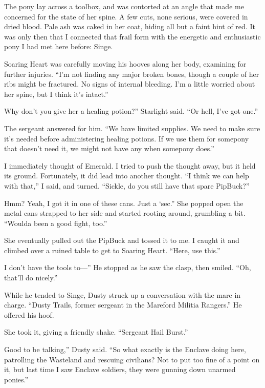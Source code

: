 The pony lay across a toolbox, and was contorted at an angle that made me concerned for the state of her spine. A few cuts, none serious, were covered in dried blood. Pale ash was caked in her coat, hiding all but a faint hint of red. It was only then that I connected that frail form with the energetic and enthusiastic pony I had met here before: Singe.

Soaring Heart was carefully moving his hooves along her body, examining for further injuries. “I’m not finding any major broken bones, though a couple of her ribs might be fractured. No signs of internal bleeding. I’m a little worried about her spine, but I think it’s intact.”

\leavevmode{}Why don’t you give her a healing potion?” Starlight said. “Or hell, I’ve got one.”

The sergeant answered for him. “We have limited supplies. We need to make sure it’s needed before administering healing potions. If we use them for somepony that doesn’t need it, we might not have any when somepony does.”

I immediately thought of Emerald. I tried to push the thought away, but it held its ground. Fortunately, it did lead into another thought. “I think we can help with that,” I said, and turned. “Sickle, do you still have that spare PipBuck?”

\leavevmode{}Hmm? Yeah, I got it in one of these cans. Just a ‘sec.” She popped open the metal cans strapped to her side and started rooting around, grumbling a bit. “Woulda been a good fight, too.”

She eventually pulled out the PipBuck and tossed it to me. I caught it and climbed over a ruined table to get to Soaring Heart. “Here, use this.”

\leavevmode{}I don’t have the tools to—” He stopped as he saw the clasp, then smiled. “Oh, that’ll do nicely.”

While he tended to Singe, Dusty struck up a conversation with the mare in charge. “Dusty Trails, former sergeant in the Mareford Militia Rangers.” He offered his hoof.

She took it, giving a friendly shake. “Sergeant Hail Burst.”

\leavevmode{}Good to be talking,” Dusty said. “So what exactly is the Enclave doing here, patrolling the Wasteland and rescuing civilians? Not to put too fine of a point on it, but last time I saw Enclave soldiers, they were gunning down unarmed ponies.”

